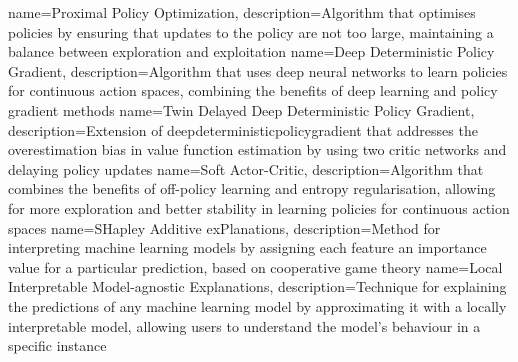 {
    name=Proximal Policy Optimization,
    description={Algorithm that optimises policies by ensuring that updates to the policy are not too large, maintaining a balance between exploration and exploitation}
}
{
    name=Deep Deterministic Policy Gradient,
    description={Algorithm that uses deep neural networks to learn policies for continuous action spaces, combining the benefits of deep learning and policy gradient methods}
}
{
    name=Twin Delayed Deep Deterministic Policy Gradient,
    description={Extension of \Gls{deepdeterministicpolicygradient} that addresses the overestimation bias in value function estimation by using two critic networks and delaying policy updates}
}
{
    name=Soft Actor-Critic,
    description={Algorithm that combines the benefits of off-policy learning and entropy regularisation, allowing for more exploration and better stability in learning policies for continuous action spaces}
}
{
    name=SHapley Additive exPlanations,
    description={Method for interpreting machine learning models by assigning each feature an importance value for a particular prediction, based on cooperative game theory}
}
{
    name=Local Interpretable Model-agnostic Explanations,
    description={Technique for explaining the predictions of any machine learning model by approximating it with a locally interpretable model, allowing users to understand the model's behaviour in a specific instance}
}

